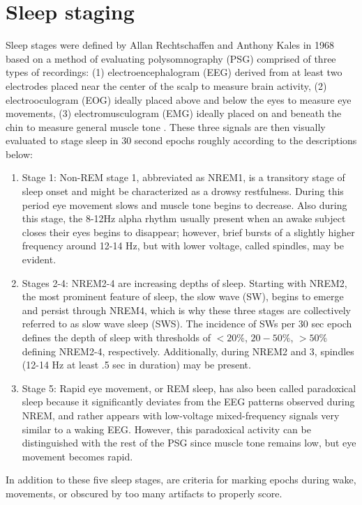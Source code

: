 \section*{Sleep staging}
Sleep stages were defined by Allan Rechtschaffen and Anthony Kales in 1968 based on a method of evaluating polysomnography (PSG) comprised of three types of recordings: (1) electroencephalogram (EEG) derived from at least two electrodes placed near the center of the scalp to measure brain activity, (2) electrooculogram (EOG) ideally placed above and below the eyes to measure eye movements, (3) electromusculogram (EMG) ideally placed on and beneath the chin to measure general muscle tone \citep{Kales1968}. These three signals are then visually evaluated to stage sleep in 30 second epochs roughly according to the descriptions below:
\begin{enumerate}
\item[] Stage 1: Non-REM stage 1, abbreviated as NREM1, is a transitory stage of sleep onset and might be characterized as a drowsy restfulness. During this period eye movement slows and muscle tone begins to decrease. Also during this stage, the 8-12Hz alpha rhythm usually present when an awake subject closes their eyes begins to disappear; however, brief bursts of a slightly higher frequency around 12-14 Hz, but with lower voltage, called spindles, may be evident.
\item[] Stages 2-4: NREM2-4 are increasing depths of sleep. Starting with NREM2, the most prominent feature of sleep, the slow wave (SW), begins to emerge and persist through NREM4, which is why these three stages are collectively referred to as slow wave sleep (SWS). The incidence of SWs per 30 sec epoch defines the depth of sleep with thresholds of $<20\%$, $20-50\%$, $>50\%$ defining NREM2-4, respectively. Additionally, during NREM2 and 3, spindles (12-14 Hz at least .5 sec in duration) may be present.
\item[] Stage 5: Rapid eye movement, or REM sleep, has also been called paradoxical sleep because it significantly deviates from the EEG patterns observed during NREM, and rather appears with low-voltage mixed-frequency signals very similar to a waking EEG. However, this paradoxical activity can be distinguished with the rest of the PSG since muscle tone remains low, but eye movement becomes rapid.
\end{enumerate}
In addition to these five sleep stages, are criteria for marking epochs during wake, movements, or obscured by too many artifacts to properly score.

